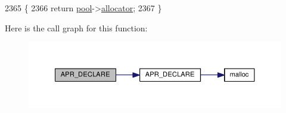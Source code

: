 \begin{DoxyCode}
2365 \{
2366     \textcolor{keywordflow}{return} \hyperlink{group__APACHE__CORE__MUTEX_ga8fea43b485988aa6df5dced9dddbe733}{pool}->\hyperlink{structapr__pool__t_a0b966157de565de389783a833e6baf15}{allocator};
2367 \}
\end{DoxyCode}


Here is the call graph for this function\+:
\nopagebreak
\begin{figure}[H]
\begin{center}
\leavevmode
\includegraphics[width=350pt]{group__apr__pools_ga4f2ec0d4771217976fecfeef29780ab0_cgraph}
\end{center}
\end{figure}


